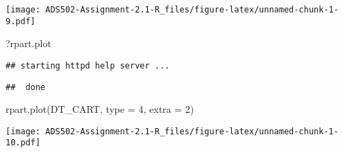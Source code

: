 \documentclass[
]{article}
\newenvironment{Shaded}{\begin{snugshade}}{\end{snugshade}}
\newcommand{\AttributeTok}[1]{\textcolor[rgb]{0.77,0.63,0.00}{#1}}
\newcommand{\DecValTok}[1]{\textcolor[rgb]{0.00,0.00,0.81}{#1}}
\newcommand{\FunctionTok}[1]{\textcolor[rgb]{0.00,0.00,0.00}{#1}}
\newcommand{\NormalTok}[1]{#1}
\begin{document}
\texttt{[image: ADS502-Assignment-2.1-R\_files/figure-latex/unnamed-chunk-1-9.pdf]}

\begin{Shaded}
\begin{Highlighting}[]
\NormalTok{?rpart.plot}
\end{Highlighting}
\end{Shaded}

\begin{verbatim}
## starting httpd help server ...
\end{verbatim}

\begin{verbatim}
##  done
\end{verbatim}

\begin{Shaded}
\begin{Highlighting}[]
\FunctionTok{rpart.plot}\NormalTok{(DT\_CART, }\AttributeTok{type =} \DecValTok{4}\NormalTok{, }\AttributeTok{extra =} \DecValTok{2}\NormalTok{)}
\end{Highlighting}
\end{Shaded}

\texttt{[image: ADS502-Assignment-2.1-R\_files/figure-latex/unnamed-chunk-1-10.pdf]}
\end{document}
